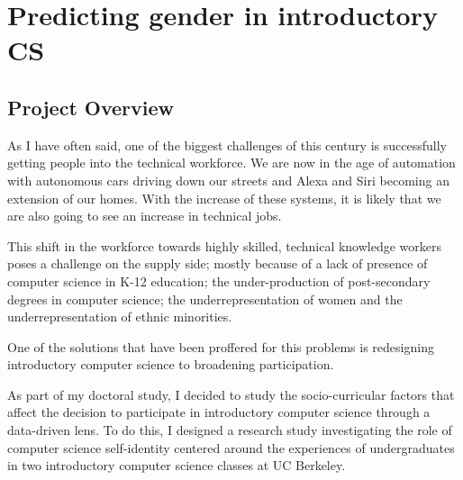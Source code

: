 \documentclass[twoside,openright,titlepage,numbers=noenddot,headinclude,%
               footinclude=true,cleardoublepage=empty,abstractoff,BCOR=5mm,%
               paper=a4,fontsize=11pt,ngerman,american]{scrreprt}
\numberwithin{theorem}{chapter}
\numberwithin{definition}{chapter}
\numberwithin{algorithm}{chapter}
\numberwithin{figure}{chapter}
\numberwithin{table}{chapter}
\numberwithin{equation}{chapter}
\begin{document}
\frenchspacing
\raggedbottom
{}
\pagestyle{plain}


%


\cleardoublepage


\chapter*{Predicting gender in introductory CS}

\section*{Project Overview}

As I have often said, one of the biggest challenges of this century is successfully getting people into the technical workforce. We are now in the age of automation with autonomous cars driving down our streets and Alexa and Siri becoming an extension of our homes. With the increase of these systems, it is likely that we are also going to see an increase in technical jobs.

This shift in the workforce towards highly skilled, technical knowledge workers poses a challenge on the supply side; mostly because of a lack of presence of computer science in K-12 education; the under-production of post-secondary degrees in computer science;  the underrepresentation of women and the underrepresentation of ethnic minorities.

One of the solutions that have been proffered for this problems is redesigning introductory computer science to broadening participation.  

As part of my doctoral study, I decided to study the socio-curricular factors that affect the decision to participate in introductory computer science through a data-driven lens. To do this, I designed a research study investigating the role of computer science self-identity centered around the experiences of undergraduates in two introductory computer science classes at UC Berkeley.
\end{document}
